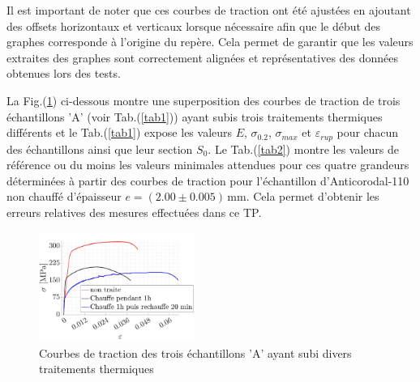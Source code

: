 \documentclass[a4paper, 12pt,oneside]{article}
\begin{document}
Il est important de noter que ces courbes de traction ont été ajustées en ajoutant des offsets horizontaux et verticaux lorsque nécessaire afin que le début des graphes corresponde à l'origine du repère. Cela permet de garantir que les valeurs extraites des graphes sont correctement alignées et représentatives des données obtenues lors des tests. 

La Fig.(\ref{fig9}) ci-dessous montre une superposition des courbes de traction de trois échantillons 'A' (voir Tab.(\ref{tab1})) ayant subis trois traitements thermiques différents et le Tab.(\ref{tab1}) expose les valeurs $E$, $ \sigma_{0.2}$, $\sigma_{max}$ et $\varepsilon_{rup}$ pour chacun des échantillons ainsi que leur section $S_0$. Le Tab.(\ref{tab2}) montre les valeurs de référence ou du moins les valeurs minimales attendues pour ces quatre grandeurs déterminées à partir des courbes de traction pour l'échantillon d'Anticorodal-110 non chauffé d'épaisseur $e=(2.00 \pm 0.005)$\,mm. Cela permet d'obtenir les erreurs relatives des mesures effectuées dans ce TP.

\begin{figure}[H]
    \centering
    \includegraphics[width=0.45\textwidth]{GRAPHES/Graphe_7_bis.jpg}
    \captionsetup{justification=centering}
    \caption{Courbes de traction des trois échantillons 'A' ayant subi divers traitements thermiques}
    \label{fig9}
\end{figure}

\vspace{-0.5cm}
\end{document}
